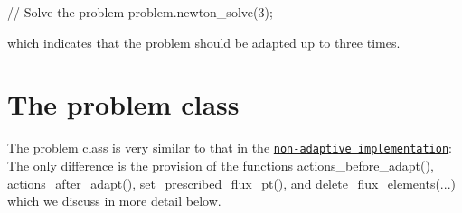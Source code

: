  
\begin{DoxyCodeInclude}
   \textcolor{comment}{// Solve the problem}
   problem.newton\_solve(3);

\end{DoxyCodeInclude}


which indicates that the problem should be adapted up to three times.



 

\hypertarget{index_problem}{}\section{The problem class}\label{index_problem}
The problem class is very similar to that in the \href{../../two_d_poisson_flux_bc2/html/index.html#problem}{\tt non-\/adaptive implementation}\+: The only difference is the provision of the functions {\ttfamily actions\+\_\+before\+\_\+adapt()}, {\ttfamily actions\+\_\+after\+\_\+adapt()}, {\ttfamily set\+\_\+prescribed\+\_\+flux\+\_\+pt()}, and {\ttfamily delete\+\_\+flux\+\_\+elements}(...) which we discuss in more detail below.

